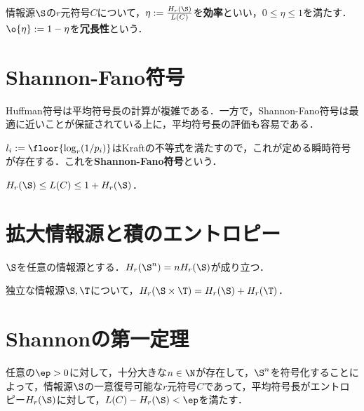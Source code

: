 \documentclass[uplatex,dvipdfmx]{jsreport}
\begin{document}
\begin{definition}
    情報源$\S$の$r$元符号$C$について，$\eta:=\frac{H_r(\S)}{L(C)}$を\textbf{効率}といい，$0\le\eta\le1$を満たす．
    $\o{\eta}:=1-\eta$を\textbf{冗長性}という．
\end{definition}

\section{Shannon-Fano符号}

\begin{tcolorbox}[colframe=ForestGreen, colback=ForestGreen!10!white,breakable,colbacktitle=ForestGreen!40!white,coltitle=black,fonttitle=\bfseries\sffamily,
title=]
    Huffman符号は平均符号長の計算が複雑である．一方で，Shannon-Fano符号は最適に近いことが保証されている上に，平均符号長の評価も容易である．
\end{tcolorbox}

\begin{definition}
    $l_i:=\floor{\log_r(1/p_i)}$はKraftの不等式を満たすので，これが定める瞬時符号が存在する．これを\textbf{Shannon-Fano符号}という．
\end{definition}

\begin{proposition}
    $H_r(\S)\le L(C)\le 1+H_r(\S)$．
\end{proposition}

\section{拡大情報源と積のエントロピー}

\begin{theorem}
    $\S$を任意の情報源とする．$H_r(\S^n)=nH_r(\S)$が成り立つ．
\end{theorem}

\begin{theorem}
    独立な情報源$\S,\T$について，$H_r(\S\times\T)=H_r(\S)+H_r(\T)$．
\end{theorem}

\section{Shannonの第一定理}

\begin{theorem}
    任意の$\ep>0$に対して，十分大きな$n\in\N$が存在して，$\S^n$を符号化することによって，情報源$\S$の一意復号可能な$r$元符号$C$であって，平均符号長がエントロピー$H_r(\S)$に対して，$L(C)-H_r(\S)<\ep$を満たす．
\end{theorem}
\end{document}
